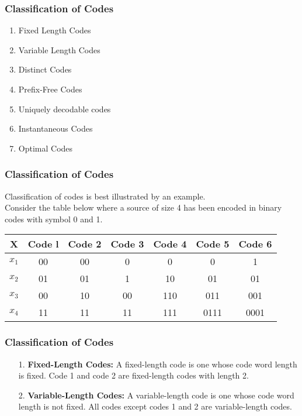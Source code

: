 \documentclass{beamer}
\begin{document}
\begin{frame}
\frametitle{Classification of Codes}
\Large
\begin{enumerate}
\item Fixed Length Codes
\item Variable Length Codes
\item Distinct Codes
\item Prefix-Free Codes
\item Uniquely decodable codes
\item Instantaneous Codes
\item Optimal Codes
\end{enumerate}
\end{frame}
\begin{frame}
\frametitle{Classification of Codes}
\Large
Classification of codes is best illustrated by an example. \\ Consider the table below where a source of
size 4 has been encoded in binary codes with symbol 0 and 1.\\ \bigskip
\large
\begin{center}
\begin{tabular}{|c| c| c| c| c| c| c|}
\hline
X& Code l& Code 2& Code 3 &Code 4& Code 5& Code 6\\\hline
$x_1$& 00& 00 &0 &0 &0 &1\\
$x_2$& 01& 01 &1 &10 &01 &01\\
$x_3$ &00 &10& 00& 110& 011 &001\\
$x_4$ &11& 11& 11& 111 &0111 &0001\\\hline
\end{tabular}
\end{center}
\end{frame}


\begin{frame}

\frametitle{Classification of Codes}
\Large
\begin{itemize}
\item[1.] \textbf{Fixed-Length Codes:} A fixed-length code is one whose code word length is fixed. Code 1 and code 2 are
fixed-length codes with length 2.
\item[2.] \textbf{Variable-Length Codes:} A variable-length code is one whose code word length is not fixed. All codes except codes 1 and 2 are variable-length codes.
\end{itemize}
\end{frame}
\end{document}
